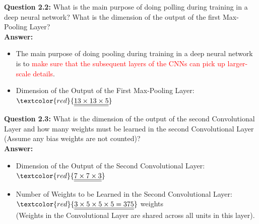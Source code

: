 \documentclass{book}
\begin{document}
\vspace{5mm}
\textbf{Question 2.2:} What is the main purpose of doing polling during training in a deep neural network? What is the dimension of the output of the first Max-Pooling Layer?\\
\textbf{Answer:}\\
\begin{itemize}
    \item The main purpose of doing pooling during training in a deep neural network is to \textcolor{red}{make sure that the subsequent layers of the CNNs can pick up larger-scale details}.\\
    \item Dimension of the Output of the First Max-Pooling Layer: $\textcolor{red}{\underline{\underline{13 \times 13 \times 5}}}$\\
\end{itemize}
\vspace{5mm}
\textbf{Question 2.3:} What is the dimension of the output of the second Convolutional Layer and how many weights must be learned in the second Convolutional Layer (Assume any bias weights are not counted)?\\
\textbf{Answer:}\\
\begin{itemize}
    \item Dimension of the Output of the Second Convolutional Layer: $\textcolor{red}{\underline{\underline{7 \times 7 \times 3}}}$\\
    \item Number of Weights to be Learned in the Second Convolutional Layer: $\textcolor{red}{\underline{\underline{3 \times 5 \times 5 \times 5 = 375}}}$ weights\\
    (Weights in the Convolutional Layer are shared across all units in this layer).\\
\end{itemize}
\end{document}
